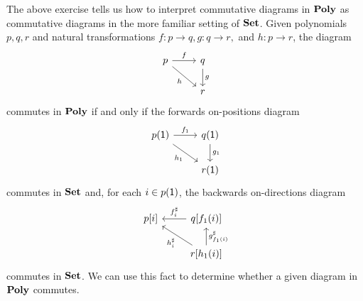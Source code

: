 \documentclass[Book-Poly]{subfiles}
\begin{document}
\begin{example} \label{ex.comm_poly}
The above exercise tells us how to interpret commutative diagrams in $\mathbf{Poly}$ as commutative diagrams in the more familiar setting of $\mathbf{Set}$.
Given polynomials $p, q, r$ and natural transformations $f \colon p \to q, g \colon q \to r,$ and $h \colon p \to r$, the diagram
\[
\begin{tikzcd}
    p \ar[r, "f"] \ar[dr, "h"'] & q \ar[d, "g"] \\
    & r
\end{tikzcd}
\]
commutes in $\mathbf{Poly}$ if and only if the forwards on-positions diagram
\[
\begin{tikzcd}
    p(\1) \ar[r, "f_1"] \ar[dr, "h_1"'] & q(\1) \ar[d, "g_1"] \\
    & r(\1)
\end{tikzcd}
\]
commutes in $\mathbf{Set}$ and, for each $i \in p(\textsf{1})$, the backwards on-directions diagram
\[
\begin{tikzcd}
    p[i] & q[f_1(i)] \ar[l, "f^\sharp_i"'] \\
    & r[h_1(i)] \ar[u, "g^\sharp_{f_1(i)}"'] \ar[ul, "h^\sharp_i"]
\end{tikzcd}
\]
commutes in $\mathbf{Set}$.
We can use this fact to determine whether a given diagram in $\mathbf{Poly}$ commutes.
\end{example}
\end{document}
